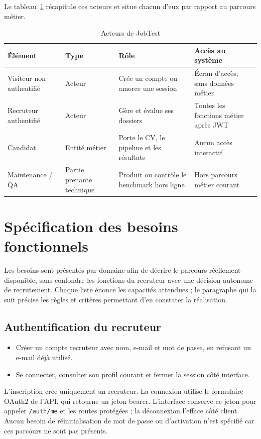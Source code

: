 Le tableau~\ref{tab:acteurs-jobtest} récapitule ces acteurs et situe chacun d'eux par rapport au parcours métier.

\begin{table}[htbp]
\centering\small
\begin{tabularx}{\textwidth}{|p{3.2cm}|p{2.5cm}|X|p{3.1cm}|}
\hline
\textbf{Élément} & \textbf{Type} & \textbf{Rôle} & \textbf{Accès au système}\\
\hline
Visiteur non authentifié & Acteur & Crée un compte ou amorce une session & Écran d'accès, sans données métier\\
\hline
Recruteur authentifié & Acteur & Gère et évalue ses dossiers & Toutes les fonctions métier après JWT\\
\hline
Candidat & Entité métier & Porte le CV, le pipeline et les résultats & Aucun accès interactif\\
\hline
Maintenance / QA & Partie prenante technique & Produit ou contrôle le benchmark hors ligne & Hors parcours métier courant\\
\hline
\end{tabularx}
\caption{Acteurs de JobTest}
\label{tab:acteurs-jobtest}
\end{table}

\section{Spécification des besoins fonctionnels}
Les besoins sont présentés par domaine afin de décrire le parcours réellement disponible, sans confondre les fonctions du recruteur avec une décision autonome de recrutement. Chaque liste énonce les capacités attendues ; le paragraphe qui la suit précise les règles et critères permettant d'en constater la réalisation.

\subsection{Authentification du recruteur}
\begin{itemize}
  \item Créer un compte recruteur avec nom, e-mail et mot de passe, en refusant un e-mail déjà utilisé.
  \item Se connecter, consulter son profil courant et fermer la session côté interface.
\end{itemize}

L'inscription crée uniquement un recruteur. La connexion utilise le formulaire OAuth2 de l'API, qui retourne un jeton bearer. L'interface conserve ce jeton pour appeler \texttt{/auth/me} et les routes protégées ; la déconnexion l'efface côté client. Aucun besoin de réinitialisation de mot de passe ou d'activation n'est spécifié car ces parcours ne sont pas présents.

